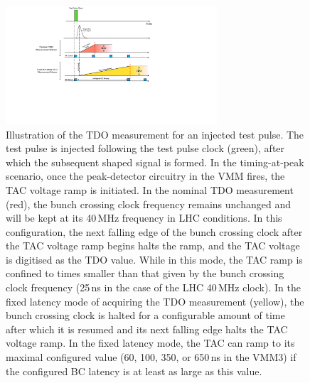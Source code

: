 \begin{figure}[!htb]
    \begin{center}
        \includegraphics[width=0.7\textwidth]{figures/nsw/calibration/tdo_illustrationPDF}
        \caption{
            Illustration of the TDO measurement for an injected test pulse.
            The test pulse is injected following the test pulse clock (green), after
            which the subsequent shaped signal is formed.
            In the timing-at-peak scenario, once the peak-detector circuitry in the VMM fires,
            the TAC voltage ramp is initiated.
            In the nominal TDO measurement (red), the bunch crossing clock frequency remains unchanged
            and will be kept at its 40\,MHz frequency in LHC conditions.
            In this configuration, the next falling edge of the bunch crossing clock after
            the TAC voltage ramp begins halts the ramp, and the TAC voltage is digitised as
            the TDO value.
            While in this mode, the TAC ramp is confined to times smaller than that given by the bunch crossing
            clock frequency (25\,ns in the case of the LHC 40\,MHz clock).
            In the fixed latency mode of acquiring the TDO measurement (yellow), the bunch crossing clock
            is halted for a configurable amount of time after which it is resumed and its
            next falling edge halts the TAC voltage ramp.
            In the fixed latency mode, the TAC can ramp to its maximal configured value (60, 100, 350, or 650\,ns in the VMM3)
            if the configured BC latency is at least as large as this value.
        }
        \label{fig:tdo_illustration}
    \end{center}
\end{figure}

